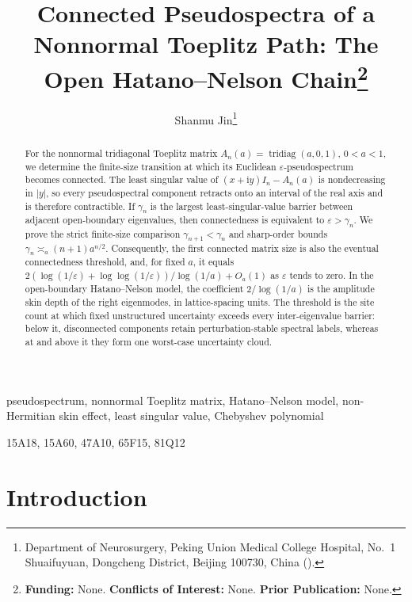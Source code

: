 \documentclass[review,hidelinks,onefignum,onetabnum]{siamart251216}
\title{Connected Pseudospectra of a Nonnormal Toeplitz Path:
The Open Hatano--Nelson Chain\thanks{{\bfseries Funding:} None.
{\bfseries Conflicts of Interest:} None.
{\bfseries Prior Publication:} None.}}
\author{Shanmu Jin\thanks{Department of Neurosurgery, Peking Union Medical
College Hospital, No.~1 Shuaifuyuan, Dongcheng District, Beijing 100730,
China (\email{jinshanmu1129@pku.edu.cn}).}}
\DeclareMathOperator{\tridiag}{tridiag}
\newcommand{\ii}{\mathrm i}
\begin{document}
\maketitle

\begin{abstract}
For the nonnormal tridiagonal Toeplitz matrix
$A_n(a)=\tridiag(a,0,1)$, $0<a<1$, we determine the finite-size
transition at which its Euclidean $\varepsilon$-pseudospectrum becomes
connected.  The least singular value of $(x+\ii y)I_n-A_n(a)$ is
nondecreasing in $|y|$, so every pseudospectral component retracts onto
an interval of the real axis and is therefore contractible.  If
$\gamma_n$ is the largest least-singular-value barrier between adjacent
open-boundary eigenvalues, then connectedness is equivalent to
$\varepsilon>\gamma_n$.  We prove the strict finite-size comparison
$\gamma_{n+1}<\gamma_n$ and sharp-order bounds
$\gamma_n\asymp_a(n+1)a^{n/2}$.  Consequently, the first connected
matrix size is also the eventual connectedness threshold, and, for fixed
$a$, it equals $2(\log(1/\varepsilon)+\log\!\log(1/\varepsilon))/
\log(1/a)+O_a(1)$ as $\varepsilon$ tends to zero.  In the open-boundary
Hatano--Nelson model, the coefficient $2/\log(1/a)$ is the amplitude skin
depth of the right eigenmodes, in lattice-spacing units.  The threshold is
the site count at which fixed unstructured uncertainty exceeds every
inter-eigenvalue barrier: below it, disconnected components retain
perturbation-stable spectral labels, whereas at and above it they form one
worst-case uncertainty cloud.
\end{abstract}

\begin{keywords}
pseudospectrum, nonnormal Toeplitz matrix, Hatano--Nelson model,
non-Hermitian skin effect, least singular value, Chebyshev polynomial
\end{keywords}

\begin{MSCcodes}
15A18, 15A60, 47A10, 65F15, 81Q12
\end{MSCcodes}

\section{Introduction}\label{sec:introduction}
\end{document}
